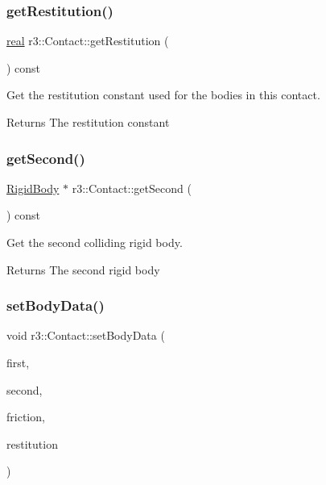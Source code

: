\subsubsection{\texorpdfstring{get\+Restitution()}{getRestitution()}}
{\footnotesize\ttfamily \mbox{\hyperlink{namespacer3_ab2016b3e3f743fb735afce242f0dc1eb}{real}} r3\+::\+Contact\+::get\+Restitution (\begin{DoxyParamCaption}{ }\end{DoxyParamCaption}) const}



Get the restitution constant used for the bodies in this contact. 

\begin{DoxyReturn}{Returns}
The restitution constant 
\end{DoxyReturn}
\mbox{\label{classr3_1_1_contact_a90af8f5c7cba65a6a84c57b5a6ef6d70}} 
\subsubsection{\texorpdfstring{get\+Second()}{getSecond()}}
{\footnotesize\ttfamily \mbox{\hyperlink{classr3_1_1_rigid_body}{Rigid\+Body}} $\ast$ r3\+::\+Contact\+::get\+Second (\begin{DoxyParamCaption}{ }\end{DoxyParamCaption}) const}



Get the second colliding rigid body. 

\begin{DoxyReturn}{Returns}
The second rigid body 
\end{DoxyReturn}
\mbox{\label{classr3_1_1_contact_af394998586bc05ec666ffbd06b0f7077}} 
\subsubsection{\texorpdfstring{set\+Body\+Data()}{setBodyData()}}
{\footnotesize\ttfamily void r3\+::\+Contact\+::set\+Body\+Data (\begin{DoxyParamCaption}\item[{\mbox{\hyperlink{classr3_1_1_rigid_body}{Rigid\+Body}} $\ast$}]{first,  }\item[{\mbox{\hyperlink{classr3_1_1_rigid_body}{Rigid\+Body}} $\ast$}]{second,  }\item[{\mbox{\hyperlink{namespacer3_ab2016b3e3f743fb735afce242f0dc1eb}{real}}}]{friction,  }\item[{\mbox{\hyperlink{namespacer3_ab2016b3e3f743fb735afce242f0dc1eb}{real}}}]{restitution }\end{DoxyParamCaption})}



